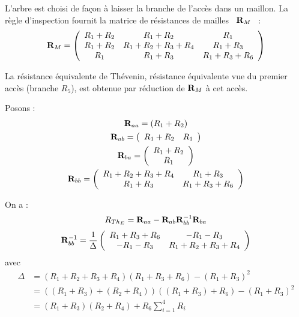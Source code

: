 \begin{enumerate}
L'arbre est choisi de façon à laisser la branche de l'accès dans un maillon. La règle
d'inspection fournit la matrice de résistances de mailles \ ${\bf R}_M$~ : 
\[ {\bf R}_M =
\left( \begin{array}{ccc} R_1+R_2 & R_1+R_2 & R_1\\ R_1+R_2 & R_1+R_2+R_3+R_4 & R_1+R_3\\
R_1 & R_1+R_3 & R_1+R_3+R_6 \end{array}\right)\]

La résistance équivalente de Thévenin, résistance équivalente vue du premier accès
(branche $R_5$), est obtenue par réduction de ${\bf R}_M$ à cet accès.

Posons : 
\begin{gather*} 
{\bf R}_{aa}=\left(R_1+R_2\right)\\ 
{\bf R}_{ab}=\left(
\begin{array}{cc} R_1+R_2 & R_1 
\end{array} \right)\\ 
{\bf R}_{ba}=\left( 
\begin{array}{c}
R_1+R_2 \\ R_1
\end{array} \right)\\ 
{\bf R}_{bb}=\left( 
\begin{array}{cc} R_1+R_2+R_3+R_4
& R_1+R_3\\ R_1+R_3 & R_1+R_3+R_6 
\end{array} \right) 
\end{gather*}

On a : 
\[R_{Th_E}={\bf R}_{aa}-{\bf R}_{ab}{\bf R}_{bb}^{-1}{\bf R}_{ba}\] 
\[ {\bf R}_{bb}^{-1} = \frac{1}{\Delta}\left(
\begin{array}{cc} R_1+R_3+R_6 & -R_1-R_3\\
-R_1-R_3 & R_1+R_2+R_3+R_4
\end{array}\right) \] 
avec 
\begin{align*}
\Delta & =
(R_1+R_2+R_3+R_4)(R_1+R_3+R_6)-(R_1+R_3)^2\\
&=((R_1+R_3)+(R_2+R_4))((R_1+R_3)+R_6)-(R_1+R_3)^2\\ 
&=(R_1+R_3)(R_2+R_4)+R_6\sum_{i=1}^4R_i 
\end{align*}


\end{enumerate}
